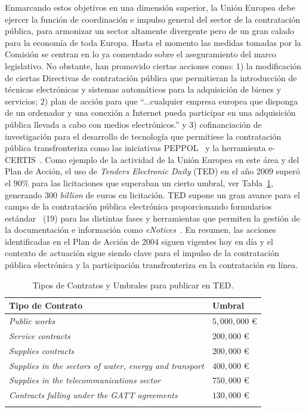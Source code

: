 Enmarcando estos objetivos en una dimensión superior, la Unión Europea debe ejercer la función
de coordinación e impulso general del sector de la contratación pública, para armonizar un sector
altamente divergente pero de un gran calado para la economía de toda Europa. Hasta el momento las
medidas tomadas por la Comisión se centran en lo ya comentado sobre el aseguramiento del marco
legislativo. No obstante, han promovido ciertas acciones como: 1) la modificación
de ciertas Directivas de contratación pública que permitieran la introducción de técnicas
electrónicas y sistemas automáticos para la adquisición de bienes y servicios; 2) plan
de acción para que ``...cualquier empresa europea que disponga de un ordenador y una conexión a
 Internet pueda participar en una adquisición pública llevada a cabo con medios electrónicos.''
y 3) cofinanciación de investigación para el desarrollo de tecnología que permitiese
la contratación pública transfronteriza como las iniciativas \gls{PEPPOL}~\cite{peppol} y la herramienta e-CERTIS~\cite{e-certis}. Como ejemplo
de la actividad de la Unión Europea en este área y del Plan de Acción, el uso 
de \textit{Tenders Electronic Daily} (\gls{TED}) en el año 2009 superó el $90\%$ para las licitaciones
que superaban un cierto umbral, ver Tabla~\ref{umbralesTed}, generando $300$ \textit{billion} de euros en licitación. TED supone un gran avance para el campo de la contratación
pública electrónica proporcionando formularios estándar~\cite{formsTed} (19) para las distintas fases y herramientas que permiten
la gestión de la documentación e información como \textit{eNotices}~\cite{eNotices}. En resumen, las acciones identificadas en el Plan de Acción de 2004 
siguen vigentes hoy en día y el contexto de actuación sigue siendo clave para el impulso de la contratación
pública electrónica y la participación transfronteriza en la contratación 
en línea.

\begin{longtable}[c]{|p{7cm}|p{8cm}|} 
\hline
  \textbf{Tipo de Contrato} & \textbf{Umbral} \\\hline
\endhead
\textit{Public works} & $5,000,000$ \euro \\ \hline 
\textit{Service contracts}&$200,000$ \euro \\ \hline 
\textit{Supplies contracts}& $200,000$ \euro \\ \hline 
\textit{Supplies in the sectors of water, energy and transport}&$400,000$ \euro \\ \hline
\textit{Supplies in the telecommunications sector}&	$750,000$ \euro \\ \hline 
\textit{Contracts falling under the GATT agreements}&	$130,000$ \euro \\ \hline
 \hline
\caption{Tipos de Contratos y Umbrales para publicar en TED.}\label{umbralesTed}\\    
\end{longtable}


